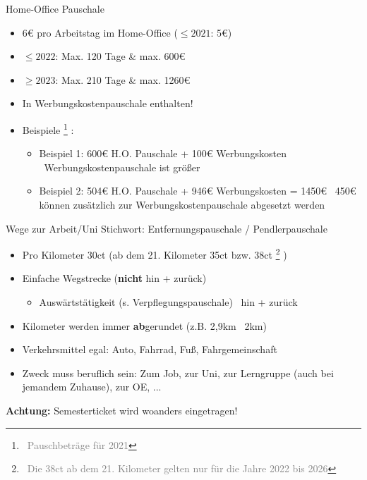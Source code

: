 \documentclass{beamer}
\let\oldfootnote\footnote
\renewcommand{\footnote}[1]
{%
	\oldfootnote
	{
		\tiny
		\textcolor{gray}{\ #1}
	}%
}
\begin{document}
			\begin{frame}{Home-Office Pauschale}
				\begin{itemize}
					\item 6€ pro Arbeitstag im Home-Office ($\leq2021$: 5€)
					\item $\leq2022$: Max. 120 Tage \& max. 600€
					\item $\geq2023$: Max. 210 Tage \& max. 1260€
					\item In Werbungskostenpauschale enthalten!
					\item Beispiele\footnote{Pauschbeträge für 2021}:
					\begin{itemize}
						\item Beispiel 1: 600€ H.O. Pauschale + 100€ Werbungskosten \textrightarrow\ Werbungskostenpauschale ist größer
						\item Beispiel 2: 504€ H.O. Pauschale + 946€ Werbungskosten = 1450€ \textrightarrow\ 450€ können zusätzlich zur Werbungskostenpauschale abgesetzt werden
					\end{itemize}
				\end{itemize}
			\end{frame}
		
			\begin{frame}{Wege zur Arbeit/Uni}
				Stichwort: Entfernungspauschale / Pendlerpauschale\n
				
				\begin{itemize}
					\item Pro Kilometer 30ct (ab dem 21. Kilometer 35ct bzw. 38ct\footnote{Die 38ct ab dem 21. Kilometer gelten nur für die Jahre 2022 bis 2026})
					\item Einfache Wegstrecke (\textbf{nicht} hin + zurück)
					\begin{itemize}
						\item Auswärtstätigkeit (s. Verpflegungspauschale) \textrightarrow\ hin + zurück
					\end{itemize}
					\item Kilometer werden immer \textbf{ab}gerundet (z.B. 2,9km \textrightarrow\ 2km)
					\item Verkehrsmittel egal: Auto, Fahrrad, Fuß, Fahrgemeinschaft
					\item Zweck muss beruflich sein: Zum Job, zur Uni, zur Lerngruppe (auch bei jemandem Zuhause), zur OE, ...
				\end{itemize}\n\pause
				
				\textbf{Achtung:} Semesterticket wird woanders eingetragen!
			\end{frame}
		
\end{document}
